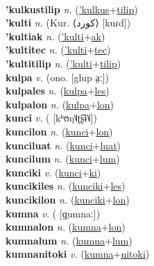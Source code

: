  \label{'kulkustec} \\
\textbf{'kulkustilip} \textit{n.} (\hyperref['kulkus]{'kulkus}+\hyperref[tilip]{tilip})
 \label{'kulkustilip} \\
\textbf{'kulti} \textit{n.} (Kur. ⟨کورد‎⟩ [kuɾd])
 \label{'kulti} \\
\textbf{'kultiak} \textit{n.} (\hyperref['kulti]{'kulti}+\hyperref[ak]{ak})
 \label{'kultiak} \\
\textbf{'kultitec} \textit{n.} (\hyperref['kulti]{'kulti}+\hyperref[tec]{tec})
 \label{'kultitec} \\
\textbf{'kultitilip} \textit{n.} (\hyperref['kulti]{'kulti}+\hyperref[tilip]{tilip})
 \label{'kultitilip} \\
\textbf{kulpa} \textit{v.} (ono. [glup a̤ː])
 \label{kulpa} \\
\textbf{kulpales} \textit{n.} (\hyperref[kulpa]{kulpa}+\hyperref[les]{les})
 \label{kulpales} \\
\textbf{kulpalon} \textit{n.} (\hyperref[kulpa]{kulpa}+\hyperref[lon]{lon})
 \label{kulpalon} \\
\textbf{kunci} \textit{v.} ( [kʰʊŋ˥˩ʈ͡ʂɨ˥˩])
 \label{kunci} \\
\textbf{kuncilon} \textit{n.} (\hyperref[kunci]{kunci}+\hyperref[lon]{lon})
 \label{kuncilon} \\
\textbf{kunciluat} \textit{n.} (\hyperref[kunci]{kunci}+\hyperref[luat]{luat})
 \label{kunciluat} \\
\textbf{kuncilum} \textit{n.} (\hyperref[kunci]{kunci}+\hyperref[lum]{lum})
 \label{kuncilum} \\
\textbf{kunciki} \textit{v.} (\hyperref[kunci]{kunci}+\hyperref[ki]{ki})
 \label{kunciki} \\
\textbf{kuncikiles} \textit{n.} (\hyperref[kunciki]{kunciki}+\hyperref[les]{les})
 \label{kuncikiles} \\
\textbf{kuncikilon} \textit{n.} (\hyperref[kunciki]{kunciki}+\hyperref[lon]{lon})
 \label{kuncikilon} \\
\textbf{kumna} \textit{v.} ( [ɡ̤umnaː])
 \label{kumna} \\
\textbf{kumnalon} \textit{n.} (\hyperref[kumna]{kumna}+\hyperref[lon]{lon})
 \label{kumnalon} \\
\textbf{kumnalum} \textit{n.} (\hyperref[kumna]{kumna}+\hyperref[lum]{lum})
 \label{kumnalum} \\
\textbf{kumnanitoki} \textit{v.} (\hyperref[kumna]{kumna}+\hyperref[nitoki]{nitoki})
 \label{kumnanitoki} \\
